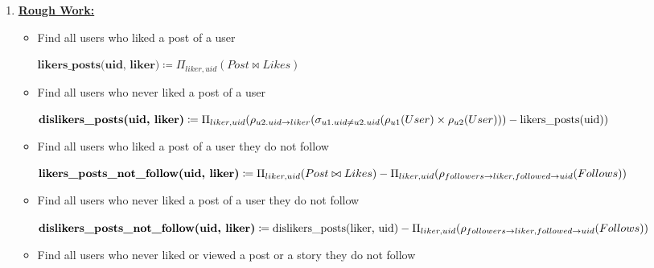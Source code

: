 \documentclass[12pt]{article}
\begin{document}
\begin{enumerate}[1.]
    \item

    \bigskip

    \underline{\textbf{Rough Work:}}

    \bigskip

    \begin{itemize}
        \item Find all users who liked a post of a user

        \begin{mdframed}
        $\textbf{likers\_posts(uid, liker)} \coloneqq \Pi_{liker, uid}(Post \bowtie Likes)$
        \end{mdframed}

        \item Find all users who never liked a post of a user

        \begin{mdframed}
        $\textbf{dislikers\_posts(uid, liker)} \coloneqq \Pi_{liker, uid}(\rho_{u2.uid \to liker}(\sigma_{u1.uid \neq u2.uid}(\\\rho_{u1}(User) \times \rho_{u2}(User))) - \text{likers\_posts(uid)})$
        \end{mdframed}

        \item Find all users who liked a post of a user they do not follow

        \begin{mdframed}
        $\textbf{likers\_posts\_not\_follow(uid, liker)} \coloneqq \Pi_{liker, uid}(Post \bowtie Likes) -\\ \Pi_{liker, uid}(\rho_{followers \to liker, followed \to uid}(Follows))$
        \end{mdframed}

        \item Find all users who never liked a post of a user they do not follow

        \begin{mdframed}
        $\textbf{dislikers\_posts\_not\_follow(uid, liker)} \coloneqq \text{dislikers\_posts(liker, uid)} -\\ \Pi_{liker, uid}(\rho_{followers \to liker, followed \to uid}(Follows))$
        \end{mdframed}

        \item Find all users who never liked or viewed a post or a story they
        do not follow


\end{itemize}
\end{enumerate}
\end{document}
